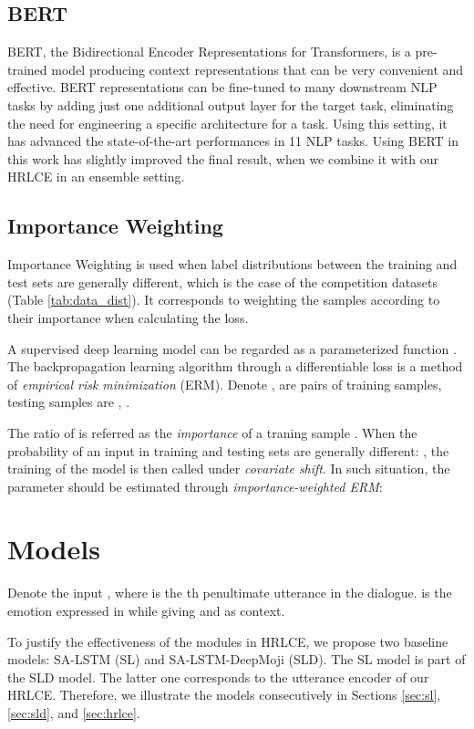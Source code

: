 \documentclass[11pt,a4paper]{article}
\begin{document}
\subsection{BERT}
\label{sec:BERT}
BERT, the Bidirectional Encoder Representations for Transformers, \cite{devlin2018bert} is a pre-trained model producing context representations that can be very convenient and effective. BERT representations can be fine-tuned to many downstream NLP tasks by adding just one additional output layer for the target task, eliminating the need for engineering a specific architecture for a task. Using this setting, it has advanced the state-of-the-art performances in 11 NLP tasks. 
Using BERT in this work has slightly improved the final result, when we combine it with our HRLCE in an ensemble setting.




\subsection{Importance Weighting}
Importance Weighting \cite{sugiyama2012machine} is used when label distributions between the training and test sets are generally different, which is the case of the competition datasets (Table \ref{tab:data_dist}).
It corresponds to weighting the samples according to their importance when calculating the loss.  


A supervised deep learning model can be regarded as a parameterized function . The backpropagation learning algorithm through a differentiable loss is a method of \emph{empirical risk minimization} (ERM). Denote ,  are pairs of training samples, testing samples are , .

The ratio of  is referred as the \emph{importance} of a traning sample .
When the probability of an input  in training and testing sets are generally different: , the training of the model  is then called under \emph{covariate shift}. In such situation, the parameter  should be estimated through \emph{importance-weighted ERM}:



\section{Models}
\label{sec:models}
Denote the input , where  is the th penultimate utterance in the dialogue.  is the emotion expressed in  while giving  and  as context.



To justify the effectiveness of the modules in HRLCE, we propose two baseline models: SA-LSTM (SL) and SA-LSTM-DeepMoji (SLD). The SL model is part of the SLD model. The latter one corresponds to the utterance encoder of our HRLCE. Therefore, we illustrate the models consecutively in Sections \ref{sec:sl}, \ref{sec:sld}, and \ref{sec:hrlce}. 
\end{document}
